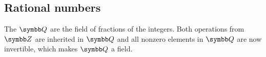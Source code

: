 \subsection{Rational numbers}\label{subsec:rational_numbers}

\begin{definition}\label{def:rational_numbers}
  The  \( \BQ \) are the field of fractions of the integers. Both operations from \( \BZ \) are inherited in \( \BQ \) and all nonzero elements in \( \BQ \) are now invertible, which makes \( \BQ \) a field.
\end{definition}
